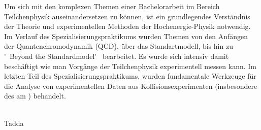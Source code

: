 Um sich mit den komplexen Themen einer Bachelorarbeit im Bereich Teilchenphysik auseinandersetzen zu können, ist ein grundlegendes Verständnis der Theorie und experimentellen Methoden der Hochenergie-Physik notwendig. Im Verlauf des Spezialisierungspraktikums wurden Themen von den Anfängen der Quantenchromodynamik (QCD), über das Standartmodell, bis hin zu \'~Beyond the Standardmodel\'~ bearbeitet. Es wurde sich intensiv damit beschäftigt wie man Vorgänge der Teilchenphysik experimentell messen kann. Im letzten Teil des Spezialisierungspraktikums, wurden fundamentale Werkzeuge für die Analyse von experimentellen Daten aus Kollisionsexperimenten (insbesondere des \lhc am \cern) behandelt.  

\\
Tadda
\\